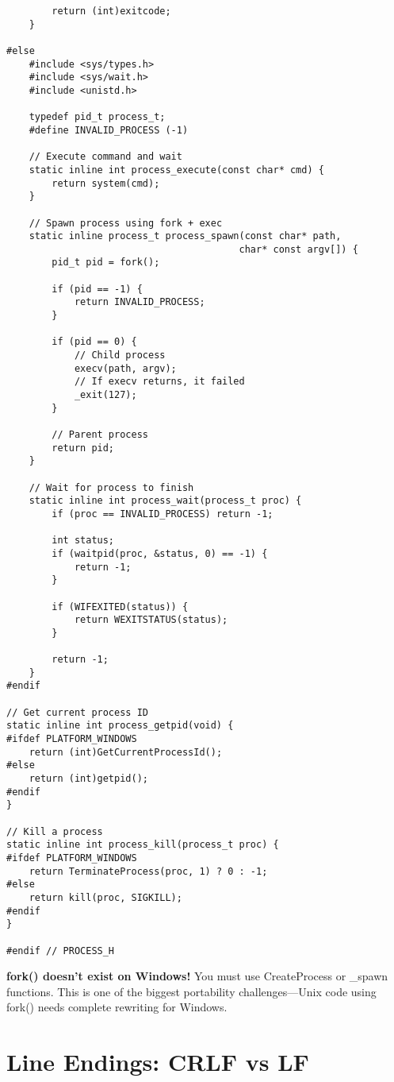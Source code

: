\begin{lstlisting}
        return (int)exitcode;
    }

#else
    #include <sys/types.h>
    #include <sys/wait.h>
    #include <unistd.h>

    typedef pid_t process_t;
    #define INVALID_PROCESS (-1)

    // Execute command and wait
    static inline int process_execute(const char* cmd) {
        return system(cmd);
    }

    // Spawn process using fork + exec
    static inline process_t process_spawn(const char* path,
                                         char* const argv[]) {
        pid_t pid = fork();

        if (pid == -1) {
            return INVALID_PROCESS;
        }

        if (pid == 0) {
            // Child process
            execv(path, argv);
            // If execv returns, it failed
            _exit(127);
        }

        // Parent process
        return pid;
    }

    // Wait for process to finish
    static inline int process_wait(process_t proc) {
        if (proc == INVALID_PROCESS) return -1;

        int status;
        if (waitpid(proc, &status, 0) == -1) {
            return -1;
        }

        if (WIFEXITED(status)) {
            return WEXITSTATUS(status);
        }

        return -1;
    }
#endif

// Get current process ID
static inline int process_getpid(void) {
#ifdef PLATFORM_WINDOWS
    return (int)GetCurrentProcessId();
#else
    return (int)getpid();
#endif
}

// Kill a process
static inline int process_kill(process_t proc) {
#ifdef PLATFORM_WINDOWS
    return TerminateProcess(proc, 1) ? 0 : -1;
#else
    return kill(proc, SIGKILL);
#endif
}

#endif // PROCESS_H
\end{lstlisting}

\begin{warningbox}
\textbf{fork() doesn't exist on Windows!} You must use CreateProcess or \_spawn functions. This is one of the biggest portability challenges---Unix code using fork() needs complete rewriting for Windows.
\end{warningbox}

\section{Line Endings: CRLF vs LF}

